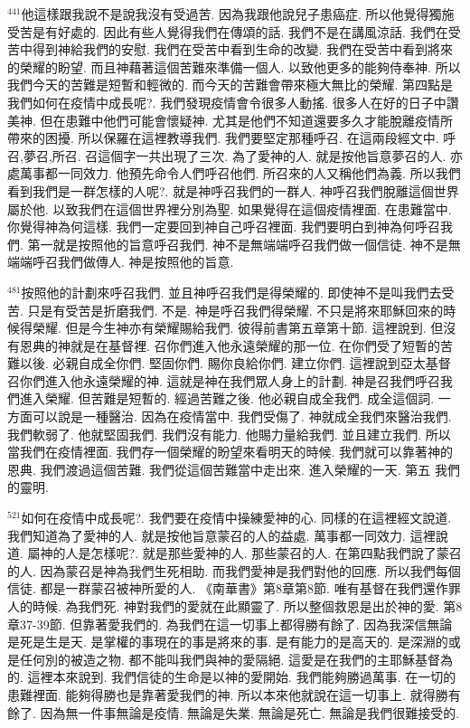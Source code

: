 \documentclass{book}
\begin{document}
$^{441}$他這樣跟我說不是說我沒有受過苦.
因為我跟他說兒子患癌症.
所以他覺得獨施受苦是有好處的.
因此有些人覺得我們在傳頌的話.
我們不是在講風涼話.
我們在受苦中得到神給我們的安慰.
我們在受苦中看到生命的改變.
我們在受苦中看到將來的榮耀的盼望.
而且神藉著這個苦難來準備一個人.
以致他更多的能夠侍奉神.
所以我們今天的苦難是短暫和輕微的.
而今天的苦難會帶來極大無比的榮耀.
第四點是我們如何在疫情中成長呢?.
我們發現疫情會令很多人動搖.
很多人在好的日子中讚美神.
但在患難中他們可能會懷疑神.
尤其是他們不知道還要多久才能脫離疫情所帶來的困擾.
所以保羅在這裡教導我們.
我們要堅定那種呼召.
在這兩段經文中.
呼召,夢召,所召.
召這個字一共出現了三次.
為了愛神的人.
就是按他旨意夢召的人.
亦處萬事都一同效力.
他預先命令人們呼召他們.
所召來的人又稱他們為義.
所以我們看到我們是一群怎樣的人呢?.
就是神呼召我們的一群人.
神呼召我們脫離這個世界屬於他.
以致我們在這個世界裡分別為聖.
如果覺得在這個疫情裡面.
在患難當中.
你覺得神為何這樣.
我們一定要回到神自己呼召裡面.
我們要明白到神為何呼召我們.
第一就是按照他的旨意呼召我們.
神不是無端端呼召我們做一個信徒.
神不是無端端呼召我們做傳人.
神是按照他的旨意.

$^{481}$按照他的計劃來呼召我們.
並且神呼召我們是得榮耀的.
即使神不是叫我們去受苦.
只是有受苦是折磨我們.
不是.
神是呼召我們得榮耀.
不只是將來耶穌回來的時候得榮耀.
但是今生神亦有榮耀賜給我們.
彼得前書第五章第十節.
這裡說到.
但沒有恩典的神就是在基督裡.
召你們進入他永遠榮耀的那一位.
在你們受了短暫的苦難以後.
必親自成全你們.
堅固你們.
賜你良給你們.
建立你們.
這裡說到亞太基督召你們進入他永遠榮耀的神.
這就是神在我們眾人身上的計劃.
神是召我們呼召我們進入榮耀.
但苦難是短暫的.
經過苦難之後.
他必親自成全我們.
成全這個詞.
一方面可以說是一種醫治.
因為在疫情當中.
我們受傷了.
神就成全我們來醫治我們.
我們軟弱了.
他就堅固我們.
我們沒有能力.
他賜力量給我們.
並且建立我們.
所以當我們在疫情裡面.
我們存一個榮耀的盼望來看明天的時候.
我們就可以靠著神的恩典.
我們渡過這個苦難.
我們從這個苦難當中走出來.
進入榮耀的一天.
第五 我們的靈明.

$^{521}$如何在疫情中成長呢?.
我們要在疫情中操練愛神的心.
同樣的在這裡經文說道.
我們知道為了愛神的人.
就是按他旨意蒙召的人的益處.
萬事都一同效力.
這裡說道.
屬神的人是怎樣呢?.
就是那些愛神的人.
那些蒙召的人.
在第四點我們說了蒙召的人.
因為蒙召是神為我們生死相助.
而我們愛神是我們對他的回應.
所以我們每個信徒.
都是一群蒙召被神所愛的人.
《南華書》第8章第8節.
唯有基督在我們還作罪人的時候.
為我們死.
神對我們的愛就在此顯靈了.
所以整個救恩是出於神的愛.
第8章37-39節.
但靠著愛我們的.
為我們在這一切事上都得勝有餘了.
因為我深信無論是死是生是天.
是掌權的事現在的事是將來的事.
是有能力的是高天的.
是深淵的或是任何別的被造之物.
都不能叫我們與神的愛隔絕.
這愛是在我們的主耶穌基督為的.
這裡本來說到.
我們信徒的生命是以神的愛開始.
我們能夠勝過萬事.
在一切的患難裡面.
能夠得勝也是靠著愛我們的神.
所以本來他就說在這一切事上.
就得勝有餘了.
因為無一件事無論是疫情.
無論是失業.
無論是死亡.
無論是我們很難接受的.
\end{document}
